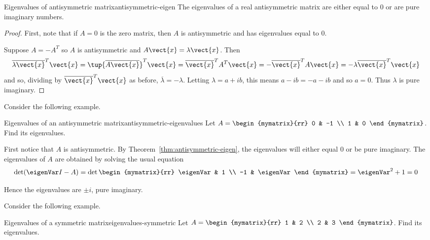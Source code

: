 \begin{theorem}{Eigenvalues of antisymmetric matrix}{antisymmetric-eigen}
The eigenvalues of a real antisymmetric matrix are either equal to $0$ or are pure imaginary numbers.
\end{theorem}

\begin{proof}
First, note that if $A=0$ is the zero matrix, then $A$ is antisymmetric and has eigenvalues equal to $0$. 

Suppose $A=-A^{T}$ so $A$ is antisymmetric and $A\vect{x}=\lambda 
\vect{x}$. Then 
\begin{equation*}
\overline{\lambda \vect{x}}^{T}\vect{x}=\tup{\overline{A
\vect{x}}} ^{T}\vect{x}=\overline{\vect{x}}^{T}A^{T}\vect{x}=-
\overline{\vect{x}}^{T}A\vect{x}=-\lambda \overline{\vect{x}}^{T}
\vect{x}
\end{equation*}
and so, dividing by $\overline{\vect{x}}^{T}\vect{x}$ as before, $
\overline{\lambda }=-\lambda$. Letting $\lambda =a+ib$, this means $
a-ib=-a-ib$ and so $a=0$. Thus $\lambda $ is pure imaginary. 
\end{proof}

Consider the following example. 

\begin{example}{Eigenvalues of an antisymmetric matrix}{antisymmetric-eigenvalues}
Let $A=\begin{mymatrix}{rr}
0 & -1 \\
1 & 0
\end{mymatrix}$.  Find its eigenvalues.
\end{example}

\begin{solution}
First notice that $A$ is antisymmetric. By Theorem~\ref{thm:antisymmetric-eigen}, the eigenvalues will either equal $0$ or be pure imaginary.  The eigenvalues of $A$ are obtained by solving the usual equation 
\[
\det (\eigenVar I - A ) = 
\det \begin{mymatrix}{rr}
\eigenVar & 1 \\ 
-1 & \eigenVar
\end{mymatrix} =\eigenVar ^{2}+1=0
\]

Hence the eigenvalues are $\pm i$, pure
imaginary.
\end{solution}

Consider the following example.

\begin{example}{Eigenvalues of a symmetric matrix}{eigenvalues-symmetric}
Let $A=\begin{mymatrix}{rr}
1 & 2 \\
2 & 3
\end{mymatrix}$. Find its eigenvalues.
\end{example}

